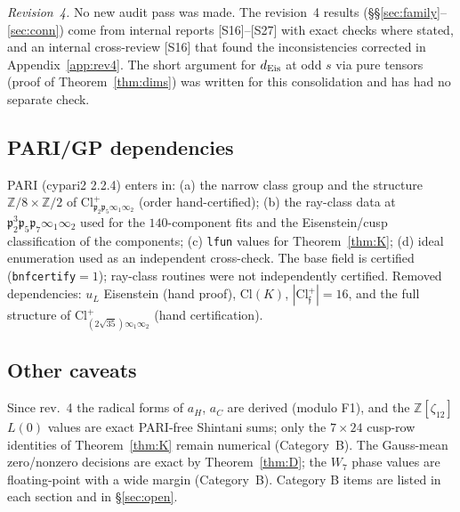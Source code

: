 \documentclass[11pt]{article}
\theoremstyle{definition}
\newcommand{\Z}{\mathbb{Z}}
\newcommand{\fp}{\mathfrak{p}}
\newcommand{\ff}{\mathfrak{f}}
\newcommand{\src}[1]{\textup{[S#1]}}
\begin{document}
\emph{Revision~4.} No new audit pass was made. The revision~4 results (\S\S\ref{sec:family}--\ref{sec:conn}) come from internal reports \src{16}--\src{27} with exact
checks where stated, and an internal cross-review \src{16} that found the inconsistencies corrected in Appendix~\ref{app:rev4}. The short argument for
$d_{\rm Eis}$ at odd $s$ via pure tensors (proof of Theorem~\ref{thm:dims}) was written for this consolidation and has had no separate check.

\subsection{PARI/GP dependencies}
PARI (cypari2 2.2.4) enters in: (a) the narrow class group and the structure $\Z/8\times\Z/2$ of $\mathrm{Cl}^+_{\fp_2\fp_5\infty_1\infty_2}$ (order hand-certified);
(b) the ray-class data at $\fp_2^3\fp_5\fp_7\infty_1\infty_2$ used for the $140$-component fits and the Eisenstein/cusp classification of the components; (c) \texttt{lfun} values for
Theorem~\ref{thm:K}; (d) ideal enumeration used as an independent cross-check. The base field is certified (\texttt{bnfcertify}$=1$); ray-class routines
were not independently certified. Removed dependencies: $u_L$ Eisenstein (hand proof), $\mathrm{Cl}(K)$, $|\mathrm{Cl}^+_\ff|=16$, and the full structure of
$\mathrm{Cl}^+_{(2\sqrt{35})\infty_1\infty_2}$ (hand certification).

\subsection{Other caveats}
Since rev.~4 the radical forms of $a_H$, $a_C$ are derived (modulo F1), and the $\Z[\zeta_{12}]$ $L(0)$ values are exact PARI-free Shintani sums; only the
$7\times24$ cusp-row identities of Theorem~\ref{thm:K} remain numerical (Category~B). The Gauss-mean zero/nonzero decisions are exact by Theorem~\ref{thm:D}; the
$W_7$ phase values are floating-point with a wide margin (Category~B). Category B items are listed in each section and in
\S\ref{sec:open}.
\end{document}
